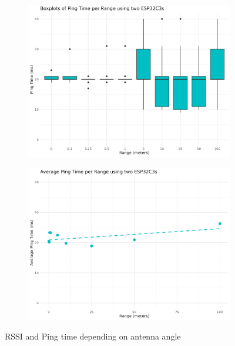 \begin{figure}[H]
    \begin{subfigure}{0.45\textwidth}
        \includegraphics[width=\linewidth]{rstudio/analysis/plots/ESP32C3_ping_box.png}
    \end{subfigure}
    \begin{subfigure}{0.45\textwidth}
        \includegraphics[width=\linewidth]{rstudio/analysis/plots/ESP32C3_avg_ping.png}
    \end{subfigure}
    \vspace{\ftspace}
    \caption{RSSI and Ping time depending on antenna angle}
    \label{fig:rssipingrange_esp32c3}
\end{figure}

